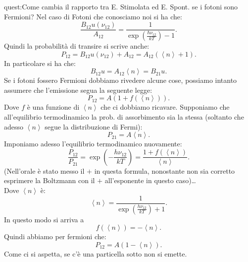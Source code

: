 \begin{quest}{quest:Come cambia il rapporto tra E. Stimolata ed E. Spont. se i fotoni sono Fermioni?}
Nel caso di Fotoni che conosciamo noi si ha che:
\[
    \frac{B_{12}u(\nu_{12})}{A_{12}} = \frac{1}{\exp\left(\frac{\hbar \nu_{12}}{kT}\right)-1}
.\] 
Quindi la probabilità di transire si scrive anche:
\[
    P_{12} = B_{12}u(\nu_{12}) + A_{12} = A_{12}\left(\left<n\right> + 1\right)
.\] 
In particolare si ha che: 
\[
    B_{12}u = A_{12}\left<n\right> = B_{21}u
.\] 
Se i fotoni fossero Fermioni dobbiamo rivedere alcune cose, possiamo intanto assumere che l'emissione segua la seguente legge:
\[
    P_{12} = A\left(1+f\left(\left<n\right>\right)\right)
.\] 
Dove $f$ è una funzione di $\left<n\right>$ che ci dobbiamo ricavare. Supponiamo che all'equilibrio termodinamico la prob. di assorbimento sia la stessa (soltanto che adesso $\left<n\right>$ segue la distribuzione di Fermi):
\[
    P_{21} = A\left<n\right>
.\] 
Imponiamo adesso l'equilibrio termodinamico nuovamente:
\[
    \frac{P_{12}}{P_{21}} = \exp\left( -\frac{h\nu_{12}}{kT}\right) = \frac{1+f\left(\left<n\right>\right)}{\left<n\right>}
.\] 
(Nell'orale è stato messo il $+$ in questa formula, nonostante non sia corretto esprimere la Boltzmann con il $+$ all'esponente in questo caso)\ldots\\
Dove $\left<n\right>$ è:
\[
    \left<n\right> = \frac{1}{\exp\left(\frac{h\nu_{12}}{kT}\right)+1}
.\] 
In questo modo si arriva a 
\[
    f\left(\left<n\right>\right)= -\left<n\right>
.\] 
Quindi abbiamo per fermioni che:
\[
    P_{12} = A\left(1-\left<n\right>\right)
.\] 
Come ci si aspetta, se c'è una particella sotto non si emette.
\end{quest}

